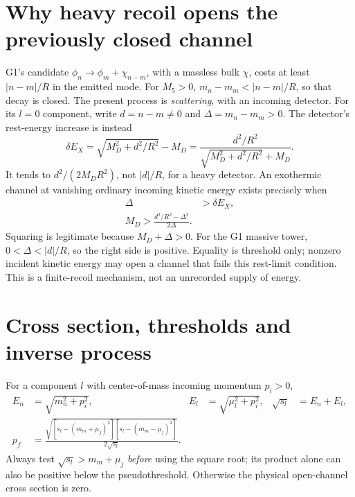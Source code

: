 \documentclass[11pt,a4paper]{article}
\begin{document}
\section{Why heavy recoil opens the previously closed channel}
G1's candidate $\phi_n\to\phi_m+\chi_{n-m}$, with a massless bulk
$\chi$, costs at least $|n-m|/R$ in the emitted mode. For $M_5>0$,
$m_n-m_m<|n-m|/R$, so that decay is closed.
The present process is \emph{scattering}, with an incoming detector.
For its $l=0$ component, write
$d=n-m\ne0$ and $\Delta=m_n-m_m>0$. The detector's rest-energy
increase is instead
\begin{equation}
 \delta E_X=\sqrt{M_D^2+d^2/R^2}-M_D
 =\frac{d^2/R^2}{\sqrt{M_D^2+d^2/R^2}+M_D}.
\end{equation}
It tends to $d^2/(2M_D R^2)$, not $|d|/R$, for a heavy detector.
An exothermic channel at vanishing ordinary incoming kinetic energy
exists precisely when
\begin{align}
 \Delta&>\delta E_X,\\
 \boxed{M_D>\frac{d^2/R^2-\Delta^2}{2\Delta}} .
 \label{eq:critical}
\end{align}
Squaring is legitimate because $M_D+\Delta>0$.
For the G1 massive tower, $0<\Delta<|d|/R$, so the right side is
positive. Equality is threshold only; nonzero incident kinetic energy
may open a channel that fails this rest-limit condition.
This is a finite-recoil mechanism, not an unrecorded supply of energy.

\section{Cross section, thresholds and inverse process}
For a component $l$ with center-of-mass incoming momentum $p_i>0$,
\begin{align}
 E_n&=\sqrt{m_n^2+p_i^2},&
 E_l&=\sqrt{\mu_l^2+p_i^2},&
 \sqrt{s_l}&=E_n+E_l,\\
 p_f&=\frac{\sqrt{[s_l-(m_m+\mu_j)^2]
                         [s_l-(m_m-\mu_j)^2]}}{2\sqrt{s_l}}.
 \label{eq:pf}
\end{align}
Always test $\sqrt{s_l}>m_m+\mu_j$ \emph{before} using the square
root; its product alone can also be positive below the pseudothreshold.
Otherwise the physical open-channel cross section is zero.
\end{document}
